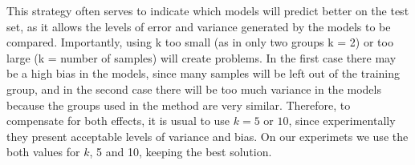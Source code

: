 This strategy often serves to indicate which models will predict better on the test set, as it allows the levels of error and variance generated by the models to be compared. Importantly, using k too small (as in only two groups k = 2) or too large (k = number of samples) will create problems. In the first case there may be a high bias in the models, since many samples will be left out of the training group, and in the second case there will be too much variance in the models because the groups used in the method are very similar. Therefore, to compensate for both effects, it is usual to use $k = 5$ or $10$, since experimentally they present acceptable levels of variance and bias. On our experimets we use the both values for $k$, 5 and 10, keeping the best solution. 


